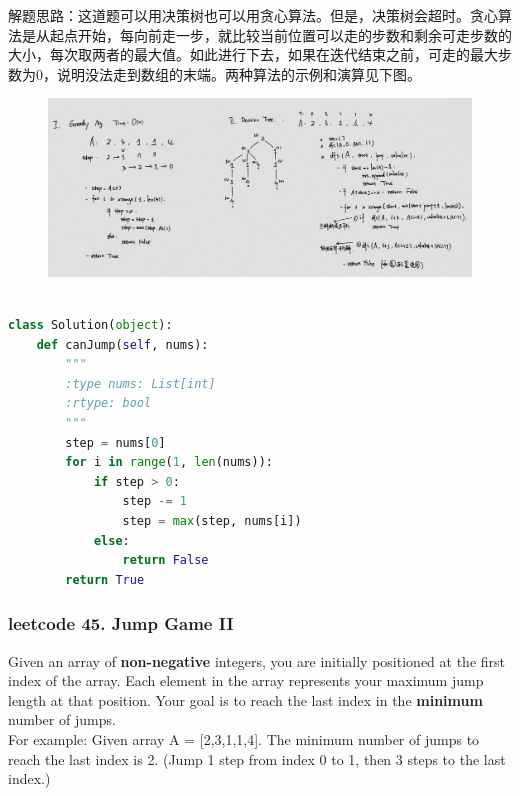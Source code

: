 \documentclass[a4paper,10pt]{article}
\begin{document}
\begin{CJK*}{UTF8}{gbsn}
\noindent 解题思路：这道题可以用决策树也可以用贪心算法。但是，决策树会超时。贪心算法是从起点开始，每向前走一步，就比较当前位置可以走的步数和剩余可走步数的大小，每次取两者的最大值。如此进行下去，如果在迭代结束之前，可走的最大步数为0，说明没法走到数组的末端。两种算法的示例和演算见下图。
\end{CJK*}

\begin{figure}[h]
    \includegraphics[width=\textwidth]{leetcode55.jpg}
    \centering \\
\end{figure}

\begin{lstlisting}[language=Python, caption=Problem55. Jump Game]

class Solution(object):
    def canJump(self, nums):
        """
        :type nums: List[int]
        :rtype: bool
        """
        step = nums[0]
        for i in range(1, len(nums)):
            if step > 0:
                step -= 1
                step = max(step, nums[i])
            else:
                return False
        return True
\end{lstlisting}


\subsubsection{leetcode 45. Jump Game II}
Given an array of \textbf{non-negative} integers, you are initially positioned at the first index of the array. Each element in the array represents your maximum jump length at that position. Your goal is to reach the last index in the \textbf{minimum} number of jumps. \\

\noindent For example: Given array A = [2,3,1,1,4]. The minimum number of jumps to reach the last index is 2. (Jump 1 step from index 0 to 1, then 3 steps to the last index.) \\
\end{document}
